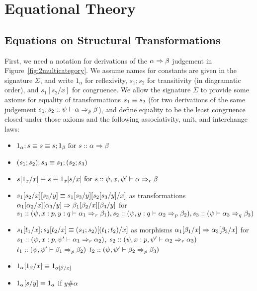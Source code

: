 \section{Equational Theory}
\label{sec:equational}

\subsection{Equations on Structural Transformations}
\label{sec:equational-transformations}

First, we need a notation for derivations of the $\alpha \spr \beta$
judgement in Figure~\ref{fig:2multicategory}.  We assume names for
constants are given in the signature $\Sigma$, and write $1_\alpha$ for
reflexivity, $s_1;s_2$ for transitivity (in diagramatic order), and
$s_1[s_2/x]$ for congruence.  We allow the signature $\Sigma$ to provide
some axioms for equality of transformations $s_1 \deq s_2$ (for two
derivations of the same judgement $s_1,s_2 ::
\wfsp{\psi}{\alpha}{\beta}{p}$), and define equality to be the least
congruence closed under those axioms and the following associativity,
unit, and interchange laws:

\begin{itemize}
\item $1_\alpha;s \deq s \deq s;1_\beta \text{ for } s :: \alpha \spr \beta$
\item $(s_1;s_2);s_3 \deq s_1;(s_2;s_3)$
\item $s[1_x/x] \deq s \deq 1_x[s/x] \text{ for } s :: \wfsp{\psi,x,\psi'}{\alpha}{\beta}{r}$
\item $\subst{\subst{s_1}{s_2}{x}}{s_3}{y} \deq
\subst{\subst{s_1}{s_3}{y}}{\subst{s_2}{s_3}{y}}{x}$ as transformations
${\subst{\subst{\alpha_1}{\alpha_2}{x}}{\alpha_3}{y}} \spr
{\subst{\subst{\beta_1}{\beta_2}{x}}{\beta_3}{y}}$ for $s_1 :: (\wfsp{\psi,x:p,y:q}{\alpha_1}{\beta_1}{r}), 
 s_2 :: (\wfsp{\psi,y:q}{\alpha_2}{\beta_2}{p}), 
 s_3 :: (\wfsp{\psi}{\alpha_3}{\beta_3}{q})$ 
\item $s_1[t_1/x];s_2[t_2/x] \deq (s_1;s_2)[(t_1;t_2)/x]$
as morphisms $\alpha_1[\beta_1/x] \spr \alpha_3[\beta_3/x]$
for $s_1 :: (\wfsp{\psi,x:p,\psi'}{\alpha_1}{\alpha_2}{r})$,
 $s_2 :: (\wfsp{\psi,x:p,\psi'}{\alpha_2}{\alpha_3}{r})$
 $t_1 :: (\wfsp{\psi,\psi'}{\beta_1}{\beta_2}{p})$
 $t_2 :: (\wfsp{\psi,\psi'}{\beta_2}{\beta_3}{p})$
\item $\subst{1_\alpha}{1_\beta}{x} \deq 1_{\subst{\alpha}{\beta}{x}}$
\item $1_\alpha[s/y] \deq 1_\alpha$ if $y \# \alpha$
\end{itemize}

